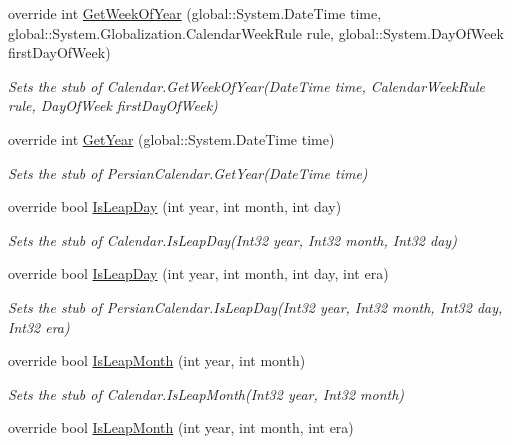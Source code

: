 \begin{DoxyCompactItemize}
override int \hyperlink{class_system_1_1_globalization_1_1_fakes_1_1_stub_persian_calendar_a9fbc9f08f29c311b616e30078727a1c7}{Get\-Week\-Of\-Year} (global\-::\-System.\-Date\-Time time, global\-::\-System.\-Globalization.\-Calendar\-Week\-Rule rule, global\-::\-System.\-Day\-Of\-Week first\-Day\-Of\-Week)
\begin{DoxyCompactList}\small\item\em Sets the stub of Calendar.\-Get\-Week\-Of\-Year(\-Date\-Time time, Calendar\-Week\-Rule rule, Day\-Of\-Week first\-Day\-Of\-Week)\end{DoxyCompactList}\item 
override int \hyperlink{class_system_1_1_globalization_1_1_fakes_1_1_stub_persian_calendar_a4b09f410be97715c2ce2a3510178aae6}{Get\-Year} (global\-::\-System.\-Date\-Time time)
\begin{DoxyCompactList}\small\item\em Sets the stub of Persian\-Calendar.\-Get\-Year(\-Date\-Time time)\end{DoxyCompactList}\item 
override bool \hyperlink{class_system_1_1_globalization_1_1_fakes_1_1_stub_persian_calendar_a802957685b840ede0d3a1b9ab3f07f10}{Is\-Leap\-Day} (int year, int month, int day)
\begin{DoxyCompactList}\small\item\em Sets the stub of Calendar.\-Is\-Leap\-Day(\-Int32 year, Int32 month, Int32 day)\end{DoxyCompactList}\item 
override bool \hyperlink{class_system_1_1_globalization_1_1_fakes_1_1_stub_persian_calendar_a09f7f97b2ce39634df4117156c653c95}{Is\-Leap\-Day} (int year, int month, int day, int era)
\begin{DoxyCompactList}\small\item\em Sets the stub of Persian\-Calendar.\-Is\-Leap\-Day(\-Int32 year, Int32 month, Int32 day, Int32 era)\end{DoxyCompactList}\item 
override bool \hyperlink{class_system_1_1_globalization_1_1_fakes_1_1_stub_persian_calendar_a7b9d5caf1f848b2682f02c66a3232c33}{Is\-Leap\-Month} (int year, int month)
\begin{DoxyCompactList}\small\item\em Sets the stub of Calendar.\-Is\-Leap\-Month(\-Int32 year, Int32 month)\end{DoxyCompactList}\item 
override bool \hyperlink{class_system_1_1_globalization_1_1_fakes_1_1_stub_persian_calendar_a0bf93dfc6a6cf57a28b8e69051e64cf8}{Is\-Leap\-Month} (int year, int month, int era)

\end{DoxyCompactItemize}
